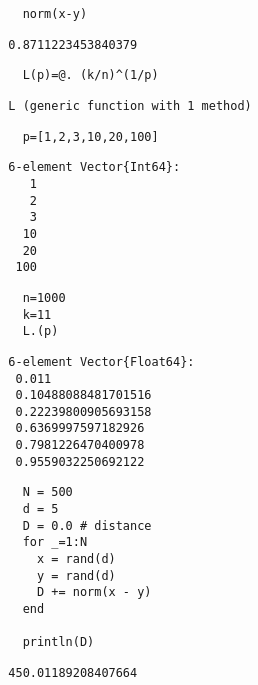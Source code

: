 \begin{tcolorbox}[width=\textwidth, left=-6mm, sharp corners, boxrule=0pt]
  \begin{verbatim}
    norm(x-y)
  \end{verbatim}
\end{tcolorbox}
\footnotesize
\vspace{-4mm}
\begin{verbatim}
  0.8711223453840379
\end{verbatim}

\begin{tcolorbox}[width=\textwidth, left=-6mm, sharp corners, boxrule=0pt]
  \begin{verbatim}
    L(p)=@. (k/n)^(1/p)
  \end{verbatim}
\end{tcolorbox}
\footnotesize
\vspace{-4mm}
\begin{verbatim}
  L (generic function with 1 method)
\end{verbatim}

\begin{tcolorbox}[width=\textwidth, left=-6mm, sharp corners, boxrule=0pt]
  \begin{verbatim}
    p=[1,2,3,10,20,100]
  \end{verbatim}
\end{tcolorbox}
\footnotesize
\vspace{-4mm}
\begin{verbatim}
  6-element Vector{Int64}:
     1
     2
     3
    10
    20
   100
\end{verbatim}

\begin{tcolorbox}[width=\textwidth, left=-6mm, sharp corners, boxrule=0pt]
  \begin{verbatim}
    n=1000
    k=11
    L.(p)
  \end{verbatim}
\end{tcolorbox}
\footnotesize
\vspace{-4mm}
\begin{verbatim}
  6-element Vector{Float64}:
   0.011
   0.10488088481701516
   0.22239800905693158
   0.6369997597182926
   0.7981226470400978
   0.9559032250692122
\end{verbatim}

\begin{tcolorbox}[width=\textwidth, left=-6mm, sharp corners, boxrule=0pt]
  \begin{verbatim}
    N = 500
    d = 5
    D = 0.0 # distance
    for _=1:N
      x = rand(d)
      y = rand(d)
      D += norm(x - y)
    end

    println(D)
  \end{verbatim}
\end{tcolorbox}
\footnotesize
\vspace{-4mm}
\begin{verbatim}
  450.01189208407664
\end{verbatim}

